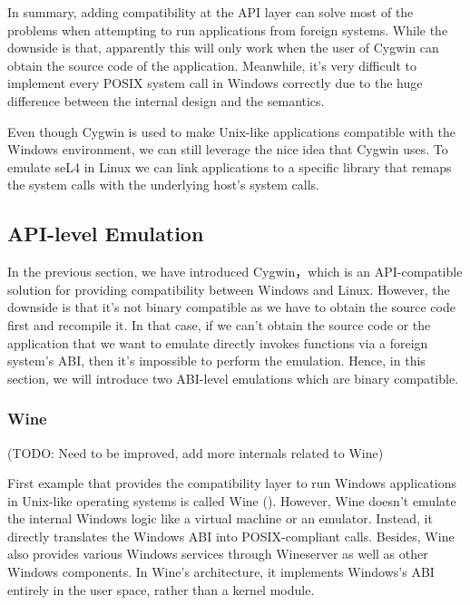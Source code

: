 In summary, adding compatibility at the API layer can solve most of the problems when attempting to run applications from foreign systems. While the downside is that, apparently this will only work when the user of Cygwin can obtain the source code of the application. Meanwhile, it's very difficult to implement every POSIX system call in Windows correctly due to the huge difference between the internal design and the semantics. 

Even though Cygwin is used to make Unix-like applications compatible with the Windows environment, we can still leverage the nice idea that Cygwin uses. To emulate seL4 in Linux we can link applications to a specific library that remaps the system calls with the underlying host's system calls.

\subsection{API-level Emulation}

In the previous section, we have introduced Cygwin，which is an API-compatible solution for providing compatibility between Windows and Linux. However, the downside is that it's not binary compatible as we have to obtain the source code first and recompile it. In that case,  if we can't obtain the source code or the application that we want to emulate directly invokes functions via a foreign system's ABI, then it's impossible to perform the emulation. Hence, in this section, we will introduce two ABI-level emulations which are binary compatible.

\subsubsection{Wine}

(TODO: Need to be improved, add more internals related to Wine)

First example that provides the compatibility layer to run Windows applications in Unix-like operating systems is called Wine (\cite{enwikiWine}). However, Wine doesn't emulate the internal Windows logic like a virtual machine or an emulator. Instead, it directly translates the Windows ABI into POSIX-compliant calls. Besides, Wine also provides various Windows services through Wineserver as well as other Windows components. In Wine's architecture, it implements Windows's ABI entirely in the user space, rather than a kernel module. 

